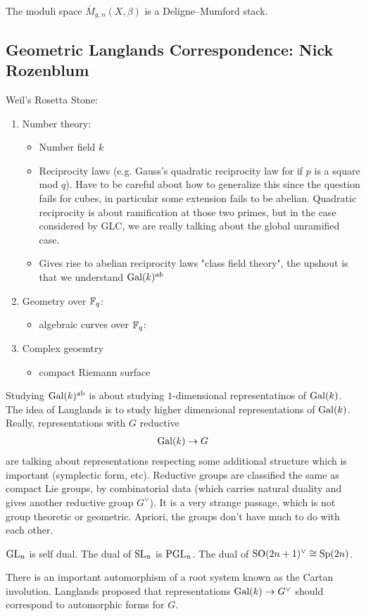 \documentclass[12pt]{article}
\begin{document}
The moduli space $\overline{M}_{g,n}(X,\beta)$ is a Deligne–Mumford stack.

\subsection{Geometric Langlands Correspondence: Nick Rozenblum}
Weil's Rosetta Stone:
\begin{enumerate}
    \item Number theory: \begin{itemize}
        \item Number field $k$
        \item Reciprocity laws (e.g. Gauss's quadratic reciprocity law for if $p$ is a square mod $q$). Have to be careful about how to generalize this since the question fails for cubes, in particular some extension fails to be abelian. Quadratic reciprocity is about ramification at those two primes, but in the case considered by GLC, we are really talking about the global unramified case.
        \item Gives rise to abelian reciprocity laws "class field theory", the upshout is that we understand $\operatorname{Gal}(k)^{ab}$
    \end{itemize}
    \item Geometry over $\mathbb{F}_q$: \begin{itemize}
        \item algebraic curves over $\mathbb{F}_q$:
    \end{itemize}
    \item Complex geoemtry\begin{itemize}
        \item compact Riemann surface
    \end{itemize}
\end{enumerate}
Studying $\operatorname{Gal}(k)^{\operatorname{ab}}$ is about studying $1$-dimensional representatinos of $\operatorname{Gal}(k)$. The idea of Langlands is to study higher dimensional representations of $\operatorname{Gal}(k)$. Really, representations with $G$ reductive \begin{align*}
    \operatorname{Gal}(k) \to G
\end{align*} are talking about representations respecting some additional structure which is important (symplectic form, etc). Reductive groups are classified the same as compact Lie groups, by combinatorial data (which carries natural duality and gives another reductive group $G^\vee$). It is a very strange passage, which is not group theoretic or geometric. Apriori, the groups don't have much to do with each other.
\begin{example}
    $\operatorname{GL}_n$ is self dual. The dual of $\operatorname{SL}_n$ is $\operatorname{PGL}_n$. The dual of $\operatorname{SO}(2n+1)^\vee \cong \operatorname{Sp}(2n)$.
\end{example}
There is an important automorphism of a root system known as the Cartan involution.
Langlands proposed that representations $\operatorname{Gal}(k) \to G^\vee$ should correspond to automorphic forms for $G$.
\end{document}
